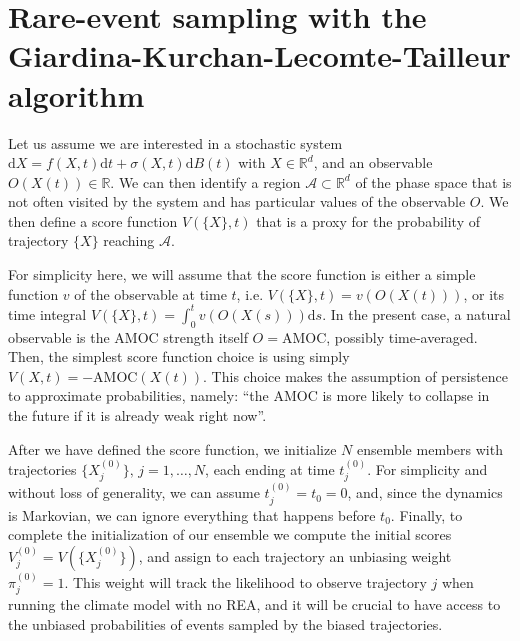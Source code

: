 \section{Rare-event sampling with the Giardina-Kurchan-Lecomte-Tailleur algorithm}\label{AppREA}

Let us assume we are interested in a stochastic system $\text{d} X = f(X, t) \text{d} t + \sigma(X, t) \text{d} B(t)$ with $X \in \mathbb{R}^d$, and an observable $O(X(t)) \in \mathbb{R}$. We can then identify a region $\mathcal{A} \subset \mathbb{R}^d$ of the phase space that is not often visited by the system and has particular values of the observable $O$.
We then define a score function $V(\{X\}, t)$ that is a proxy for the probability of trajectory $\{X\}$ reaching $\mathcal{A}$. 

For simplicity here, we will assume that the score function is either a simple function $v$ of the observable at time $t$, i.e. $V(\{X\}, t) = v(O(X(t)))$, or its time integral $V(\{X\}, t) = \int_{0}^t v(O(X(s)))\text{d} s$.
In the present case,  a natural observable is the AMOC strength itself $O = \mathrm{AMOC}$, possibly time-averaged. Then, the simplest score function choice is using simply $V({X}, t) = -\mathrm{AMOC}(X(t))$. This choice makes the assumption of persistence to approximate probabilities, namely: ``the AMOC is more likely to collapse in the future if it is already weak right now''. 

After we have defined the score function, we initialize $N$ ensemble members with trajectories $\{X^{(0)}_j\}, \, j = 1, \ldots, N$, each ending at time $t^{(0)}_j$. For simplicity and without loss of generality, we can assume $t^{(0)}_j = t_0 = 0$, and,
since the dynamics is Markovian, we can ignore everything that happens before $t_0$.
Finally, to complete the initialization of our ensemble we compute the initial scores $V_j^{(0)} = V(\{X^{(0)}_j\})$, and assign to each trajectory an unbiasing weight $\pi_j^{(0)} = 1$. This weight will track the likelihood to observe trajectory $j$ when running the climate model with no REA, and it will be crucial to have access to the unbiased probabilities of events sampled by the biased trajectories.

